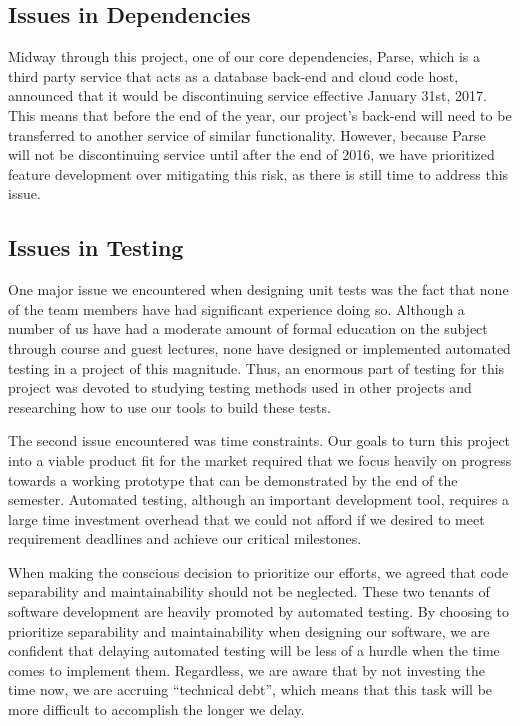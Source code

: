 \subsection{Issues in Dependencies}

Midway through this project, one of our core dependencies, Parse, which is a
third party service that acts as a database back-end and cloud code host,
announced that it would be discontinuing service effective January 31st, 2017.
This means that before the end of the year, our project's back-end will need to
be transferred to another service of similar functionality. However, because
Parse will not be discontinuing service until after the end of 2016, we have
prioritized feature development over mitigating this risk, as there is still
time to address this issue.


\subsection{Issues in Testing}

One major issue we encountered when designing unit tests was the fact that none
of the team members have had significant experience doing so. Although a number
of us have had a moderate amount of formal education on the subject through
course and guest lectures, none have designed or implemented automated testing in
a project of this magnitude. Thus, an enormous part of testing for this project
was devoted to studying testing methods used in other projects and researching
how to use our tools to build these tests.

The second issue encountered was time constraints. Our goals to turn this
project into a viable product fit for the market required that we focus heavily
on progress towards a working prototype that can be demonstrated by the end of
the semester. Automated testing, although an important development tool, requires
a large time investment overhead that we could not afford if we desired to meet
requirement deadlines and achieve our critical milestones.

When making the conscious decision to prioritize our efforts, we agreed that code
separability and maintainability should not be neglected. These two tenants of
software development are heavily promoted by automated testing. By choosing to
prioritize separability and maintainability when designing our software, we are
confident that delaying automated testing will be less of a hurdle when the time
comes to implement them. Regardless, we are aware that by not investing the time
now, we are accruing ``technical debt'', which means that this task will be more
difficult to accomplish the longer we delay.


